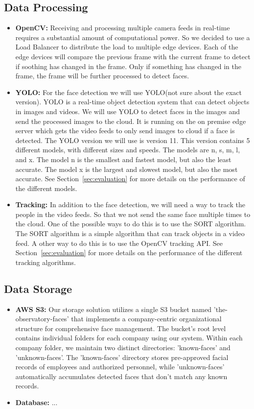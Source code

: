 \documentclass[conference]{IEEEtran}
\begin{document}
\subsection{Data Processing}
\begin{itemize}
      \item \textbf{OpenCV:} Receiving and processing multiple camera feeds in real-time requires a substantial amount of computational power.
            So we decided to use a Load Balancer to distribute the load to multiple edge devices.
            Each of the edge devices will compare the previous frame with the current frame to detect if soothing has changed in the frame.
            Only if something has changed in the frame, the frame will be further processed to detect faces.
      \item \textbf{YOLO:} For the face detection we will use YOLO(not sure about the exact version). YOLO is a real-time object detection system that can detect objects in images and videos.
            We will use YOLO to detect faces in the images and send the processed images to the cloud. It is running on the on premise edge server which gets the video feeds to only
            send images to cloud if a face is detected.
            The YOLO version we will use is version 11. This version contains 5 different models, with different sizes and speeds. The models are n, s, m, l, and x.
            The model n is the smallest and fastest model, but also the least accurate. The model x is the largest and slowest model, but also the most accurate.
            See Section~\ref{sec:evaluation} for more details on the performance of the different models.
      \item \textbf{Tracking:} In addition to the face detection, we will need a way to track the people in the video feeds. So that we not send the same face multiple times to the cloud.
            One of the possible ways to do this is to use the SORT algorithm. The SORT algorithm is a simple algorithm that can track objects in a video feed.
            A other way to do this is to use the OpenCV tracking API. See Section~\ref{sec:evaluation} for more details on the performance of the different tracking algorithms.
\end{itemize}
\subsection{Data Storage}
\begin{itemize}
      \item \textbf{AWS S3:} Our storage solution utilizes a single S3 bucket named 'the-observatory-faces' that implements a company-centric organizational structure for comprehensive face management. The bucket's root level contains individual folders for each company using our system. Within each company folder, we maintain two distinct directories: 'known-faces' and 'unknown-faces'. The 'known-faces' directory stores pre-approved facial records of employees and authorized personnel, while 'unknown-faces' automatically accumulates detected faces that don't match any known records.
      \item \textbf{Database:} ...
\end{itemize}
\end{document}
